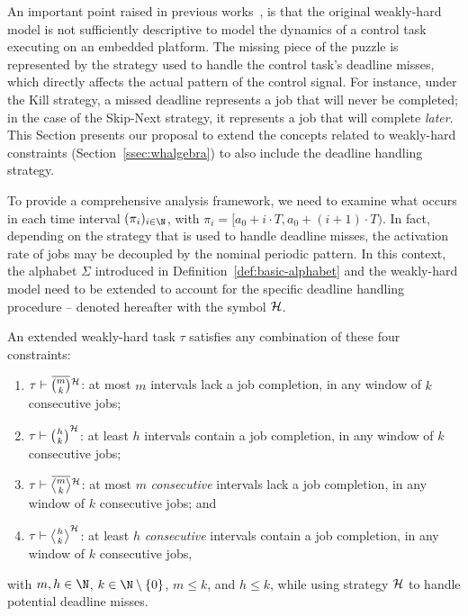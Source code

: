 An important point raised in previous works~\cite{Pazzaglia:2018, Pazzaglia:2019, Maggio:2020, Vreman:2021}, is that the original weakly-hard model is not sufficiently descriptive to model the dynamics of a control task executing on an embedded platform.
The missing piece of the puzzle is represented by the strategy used to handle the control task's deadline misses, which directly affects the actual pattern of the control signal.
For instance, under the Kill strategy, a missed deadline represents a job that will never be completed;
in the case of the Skip-Next strategy, it represents a job that will complete \emph{later}.
%
This Section presents our proposal to extend the concepts related to weakly-hard constraints (Section~\ref{ssec:whalgebra}) to also include the deadline handling strategy. 

To provide a comprehensive analysis framework, we need to examine what occurs in each time interval $(\pi_i)_{i \in \N}$, with $\pi_i = [a_0 + i\cdot T, a_0 + (i+1)\cdot T)$. 
In fact, depending on the strategy that is used to handle deadline misses, the activation rate of jobs may be decoupled by the nominal periodic pattern.
In this context, the alphabet $\Sigma$ introduced in Definition~\ref{def:basic-alphabet} and the weakly-hard model need to be extended to account for the specific deadline handling procedure -- denoted hereafter with the symbol $\mathcal{H}$.
%

\begin{definition}%
    \label{def:new-mk}%
    An extended weakly-hard task $\tau$ satisfies any combination of these four constraints:
    \begin{enumerate}[label=(\roman*)]
        \item $\tau \vdash \overbar{\binom{m}{k}}^{\strat}$: at most $m$ intervals lack a job completion, in any window of $k$ consecutive jobs;
        \item $\tau \vdash \binom{h}{\!\:\!\:k\!\:\!\:}^{\mathcal{H}}$: at least $h$ intervals contain a job completion, in any window of $k$ consecutive jobs;
        \item $\tau \vdash \overbar{\genfrac{<}{>}{0pt}{}{m}{\!\:\!\:k\!\:\!\:}}^{\strat}$: at most $m$ \emph{consecutive} intervals lack a job completion, in any window of $k$ consecutive jobs; and
        \item $\tau \vdash \genfrac{<}{>}{0pt}{}{h}{\!\:\!\:k\!\:\!\:}^{\strat}$: at least $h$ \emph{consecutive} intervals contain a job completion, in any window of $k$ consecutive jobs,
    \end{enumerate}
    with $m,h\in \N$, $k \in \N\setminus \left\{ 0 \right\}$, $m\leq k$, and $h\leq k$, while using strategy $\mathcal{H}$ to handle potential deadline misses.
\end{definition}

